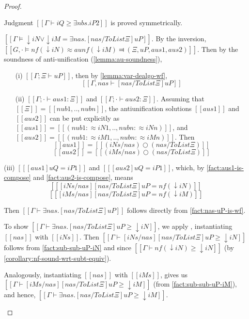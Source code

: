 \begin{proof}
\begin{caseof}
     Judgment $[[Γ ⊢ iQ ≥ ∃nbs.iP2]]$ is proved symmetrically.
  \item $[[Γ ⊨ ↓iN ∨ ↓iM = ∃nas.[nas / ToList Ξ]uP]]$.
    By the inversion, $[[G,· ⊨ nf(↓iN) ≈au nf(↓iM) ⫤ (Ξ, uP, aus1, aus2)]]$.
    Then by the soundness of anti-unification (\cref{lemma:au-soundness}),
    \begin{enumerate}
    \item[(i)] $[[Γ ; Ξ ⊢ uP]]$, then
      by \cref{lemma:var-dealgo-wf},
      \begin{equation} \label{fact:nas-uP-is-wf} [[Γ, nas ⊢ [nas / ToList Ξ]uP]] \end{equation}
    \item[(ii)] $[[Γ ; · ⊢ aus1 : Ξ]]$ and $[[Γ ; · ⊢ aus2 : Ξ]]$.
      Assuming that $[[Ξ]] = [[nub1,..,nubn]]$,
      the antiunification solutions $[[aus1]]$ and $[[aus2]]$ can be
      put explicitly as $[[aus1]] = [[(nub1 :≈ iN1,..,nubn :≈ iNn)]]$,
      and $[[aus2]] = [[(nub1 :≈ iM1,..,nubn :≈ iMn)]]$.
      Then
      \begin{equation}
        \label{fact:aus1-is-compose}
        [[ aus1 ]] = [[ (iNs / nas) ○ (nas / ToList Ξ) ]] 
      \end{equation}
      \begin{equation}
        \label{fact:aus2-is-compose}
        [[ aus2 ]] = [[ (iMs / nas) ○ (nas / ToList Ξ) ]]
      \end{equation}
    \end{enumerate}
  \item[(iii)] $[[ [aus1] uQ = iP1 ]]$ and $[[ [aus2] uQ = iP1 ]]$,
    which, by \ref{fact:aus1-is-compose} and \ref{fact:aus2-is-compose},
    means
    \begin{equation}
      \label{fact:sub-sub-uP-iN}
      [[ [iNs / nas][nas / ToList Ξ]uP = nf(↓iN) ]]
    \end{equation}
    \begin{equation}
      \label{fact:sub-sub-uP-iM}
      [[ [iMs / nas][nas / ToList Ξ]uP = nf(↓iM) ]]
    \end{equation}

    Then $[[Γ ⊢ ∃nas.[nas / ToList Ξ]uP]]$
    follows directly from \ref{fact:nas-uP-is-wf}.

    To show $[[Γ ⊢ ∃nas.[nas / ToList Ξ]uP ≥ ↓iN]]$,
    we apply ,
    instantiating $[[nas]]$ with $[[iNs]]$.
    Then $[[Γ ⊢ [iNs / nas][nas / ToList Ξ]uP ≥ ↓iN ]]$ follows
    from \ref{fact:sub-sub-uP-iN} and 
    since $[[Γ ⊢ nf(↓iN) ≥ ↓iN]]$ (by \cref{corollary:nf-sound-wrt-subt-equiv}).

    Analogously, instantiating $[[nas]]$ with $[[iMs]]$,
    gives us $[[Γ ⊢ [iMs / nas][nas / ToList Ξ]uP ≥ ↓iM ]]$
    (from \ref{fact:sub-sub-uP-iM}), and hence,
    $[[Γ ⊢ ∃nas.[nas / ToList Ξ]uP ≥ ↓iM]]$.

  \end{caseof}

\end{proof}


